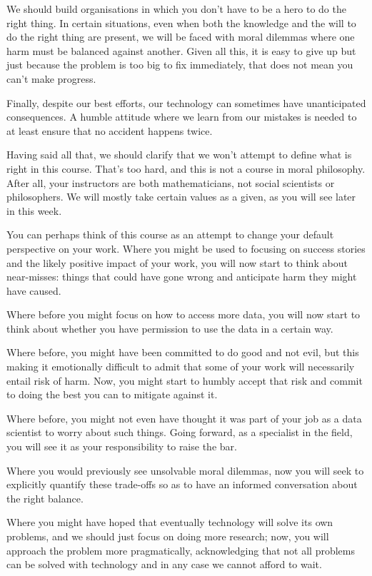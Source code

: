 \documentclass[
]{book}
\theoremstyle{definition}
\theoremstyle{definition}
\theoremstyle{definition}
\theoremstyle{definition}
\theoremstyle{remark}
\begin{document}
We should build organisations in which you don't have to be a hero to do the right thing. In certain situations, even when both the knowledge and the will to do the right thing are present, we will be faced with moral dilemmas where one harm must be balanced against another. Given all this, it is easy to give up but just because the problem is too big to fix immediately, that does not mean you can't make progress.

Finally, despite our best efforts, our technology can sometimes have unanticipated consequences. A humble attitude where we learn from our mistakes is needed to at least ensure that no accident happens twice.

Having said all that, we should clarify that we won't attempt to define what is right in this course. That's too hard, and this is not a course in moral philosophy. After all, your instructors are both mathematicians, not social scientists or philosophers. We will mostly take certain values as a given, as you will see later in this week.

You can perhaps think of this course as an attempt to change your default perspective on your work. Where you might be used to focusing on success stories and the likely positive impact of your work, you will now start to think about near-misses: things that could have gone wrong and anticipate harm they might have caused.

Where before you might focus on how to access more data, you will now start to think about whether you have permission to use the data in a certain way.

Where before, you might have been committed to do good and not evil, but this making it emotionally difficult to admit that some of your work will necessarily entail risk of harm. Now, you might start to humbly accept that risk and commit to doing the best you can to mitigate against it.

Where before, you might not even have thought it was part of your job as a data scientist to worry about such things. Going forward, as a specialist in the field, you will see it as your responsibility to raise the bar.

Where you would previously see unsolvable moral dilemmas, now you will seek to explicitly quantify these trade-offs so as to have an informed conversation about the right balance.

Where you might have hoped that eventually technology will solve its own problems, and we should just focus on doing more research; now, you will approach the problem more pragmatically, acknowledging that not all problems can be solved with technology and in any case we cannot afford to wait.
\end{document}
